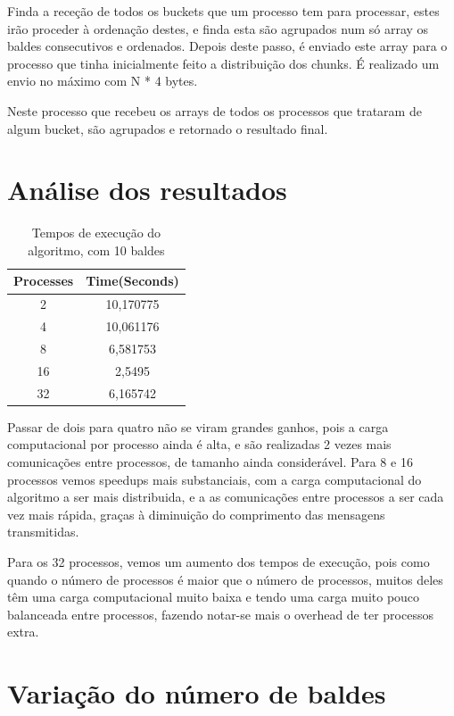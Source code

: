 \documentclass[a4paper]{report}
\begin{document}
Finda a receção de todos os buckets que um processo tem para processar, estes
irão proceder à ordenação destes, e finda esta são agrupados num só array os
baldes consecutivos e ordenados. Depois deste passo, é enviado este array para o
processo que tinha inicialmente feito a distribuição dos chunks. É realizado um
envio no máximo com N * 4 bytes.

Neste processo que recebeu os arrays de todos os processos que trataram de algum
bucket, são agrupados e retornado o resultado final.

\pagebreak
\section{Análise dos resultados}
\begin{table}[h]
    \centering
    \begin{tabular}{|c|c|}
        \hline
        Processes & Time(Seconds) \\ \hline
        2         & 10,170775     \\ \hline
        4         & 10,061176     \\ \hline
        8         & 6,581753      \\ \hline
        16        & 2,5495        \\ \hline
        32        & 6,165742      \\ \hline
    \end{tabular}
    \caption{\label{tab:Times}Tempos de execução do algoritmo, com 10 baldes}
\end{table}

Passar de dois para quatro não se viram grandes ganhos, pois a carga
computacional por processo ainda é alta, e são realizadas 2 vezes mais
comunicações entre processos, de tamanho ainda considerável. Para 8 e 16
processos vemos speedups mais substanciais, com a carga computacional do
algoritmo a ser mais distribuida, e a as comunicações entre processos a ser cada
vez mais rápida, graças à diminuição do comprimento das mensagens transmitidas.

Para os 32 processos, vemos um aumento dos tempos de execução, pois como quando
o número de processos é maior que o número de processos, muitos deles têm uma
carga computacional muito baixa e tendo uma carga muito pouco balanceada entre
processos, fazendo notar-se mais o overhead de ter processos extra.

\section{Variação do número de baldes}
\end{document}
